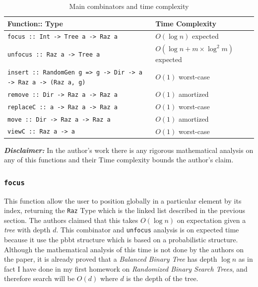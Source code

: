 \documentclass[12pt, a4paper]{article}
\begin{document}
\begin{table}[H]
 \begin{tabular}{|l|l|}
  \hline
   Function:: Type & Time Complexity\\
  \hline
  \texttt{focus :: Int -> Tree a -> Raz a} & $O(\log{n})$ expected \\
  \texttt{unfocus :: Raz a -> Tree a} & $O(\log{n} + m \times \log^2{m})$ expected \\
  \hline
  \multicolumn{1}{|p{3cm}|}{\setlength{\rightskip}{0pt plus 1 fill}\texttt{insert :: RandomGen g => g -> Dir -> a -> Raz a -> (Raz a, g)}} & $O(1)$ worst-case \\
  \hline
  \texttt{remove :: Dir -> Raz a -> Raz a} & $O(1)$ amortized  \\
  \texttt{replaceC :: a -> Raz a -> Raz a} & $O(1)$ worst-case  \\
  \texttt{move :: Dir -> Raz a -> Raz a} & $O(1)$ amortized  \\
  \texttt{viewC :: Raz a -> a} & $O(1)$ worst-case  \\
  \hline
 \end{tabular}
\caption{Main combinators and time complexity}
\label{table:1}
\end{table}

\textbf{\textit{Disclaimer:}} In the author's work \cite{raz} there is any rigorous mathematical analysis on any of this functions and their Time complexity bounds the author's claim.

 \subsubsection{%
 \texorpdfstring{\texttt{focus}}%
  {-{}-enable-so-version}}

  This function allow the user to position globally in a particular element by its index, returning the \texttt{Raz} Type which is the linked list described in the previous section. The authors claimed that this takes $O(\log{n})$ on expectation given a \textit{tree} with depth $d$. This combinator and \texttt{unfocus} analysis is on expected time because it use the \acrshort{pbbt} structure which is based on a probabilistic structure. Although the mathematical analysis of this time is not done by the authors on the paper, it is already proved that a \textit{Balanced Binary Tree} has depth $\log{n}$ as in fact I have done in my first homework on \textit{Randomized Binary Search Trees}, and therefore search will be $O(d)$ where $d$ is the depth of the tree.
\end{document}
